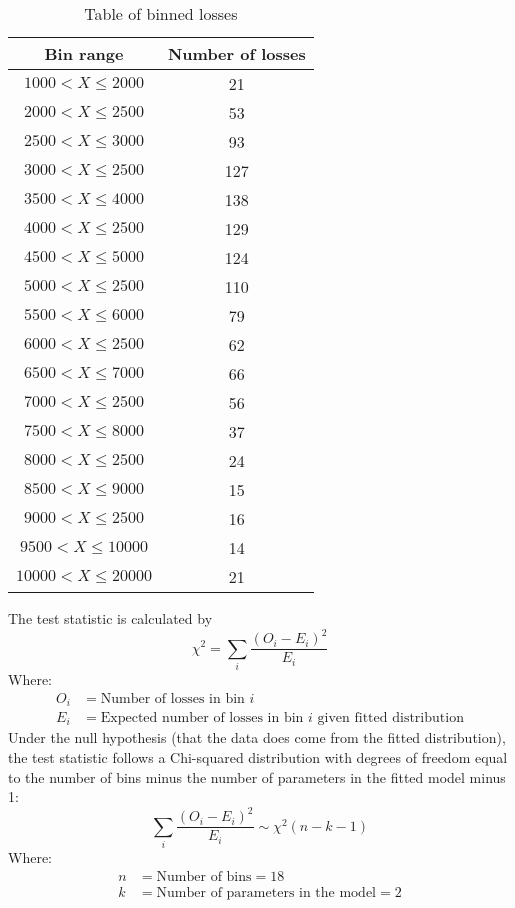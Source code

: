 \documentclass[titlepage]{article}
\begin{document}
		
	\begin{table}[H]
		\begin{center}
			\begin{tabular}{ |c|c|} 
			\hline
			Bin range & Number of losses\\ 
			\hline
			$1000 < X \leq 2000$ &  21  \\ 
			$2000 < X \leq 2500$ &  53  \\ 
			$2500 < X \leq 3000$ &  93  \\ 
			$3000 < X \leq 2500$ &  127  \\ 
			$3500 < X \leq 4000$ &  138  \\ 
			$4000 < X \leq 2500$ &  129  \\ 
			$4500 < X \leq 5000$ &  124  \\ 
			$5000 < X \leq 2500$ &  110  \\ 
			$5500 < X \leq 6000$ &  79  \\ 
			$6000 < X \leq 2500$ &  62  \\ 
			$6500 < X \leq 7000$ &  66  \\ 
			$7000 < X \leq 2500$ &  56  \\ 
			$7500 < X \leq 8000$ &  37  \\ 
			$8000 < X \leq 2500$ &  24  \\ 
			$8500 < X \leq 9000$ &  15  \\ 
			$9000 < X \leq 2500$ &  16  \\ 
			$9500 < X \leq 10000$ &  14  \\ 
			$10000 < X \leq 20000$ &  21  \\ 
			
			\hline
			\end{tabular} 
		\end{center}
			\caption{Table of binned losses} \label{T1:binned losses}
	\end{table}

	
	The test statistic is calculated by
	$$\chi^2 = \sum_{i}\frac{(O_i - E_i)^2}{E_i}$$
	Where:
	\begin{align*}
		O_i &= \text{Number of losses in bin $i$}\\
		E_i &= \text{Expected number of losses in bin $i$ given fitted distribution}
	\end{align*}
	Under the null hypothesis (that the data does come from the fitted distribution), the test statistic follows a Chi-squared distribution with degrees of freedom equal to the number of bins minus the number of parameters in the fitted model minus 1:
	$$\sum_{i}\frac{(O_i - E_i)^2}{E_i} \sim \chi^2(n - k - 1)$$
	Where:
	\begin{align*}
		n &= \text{Number of bins} = 18 \\
		k &= \text{Number of parameters in the model} = 2\\
	\end{align*}
	
\end{document}
